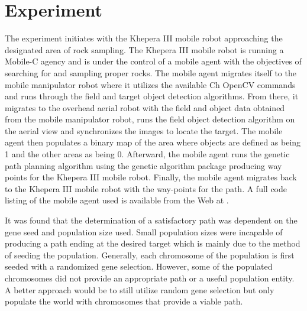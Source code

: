   \section{Experiment}
    The experiment initiates with the Khepera III mobile robot approaching the 
      designated area of rock sampling.
    The Khepera III mobile robot is running a Mobile-C agency and is under the 
      control of a mobile agent with the objectives of searching for and 
      sampling proper rocks.
    The mobile agent migrates itself to the mobile manipulator robot where it 
      utilizes the available Ch OpenCV commands and runs through the field and 
      target object detection algorithms.
    From there, it migrates to the overhead aerial robot with the field and 
      object data obtained from the mobile manipulator robot, runs the field 
      object detection algorithm on the aerial view and synchronizes the images 
      to locate the target.
    The mobile agent then populates a binary map of the area where objects are 
      defined as being 1 and the other areas as being 0.
    Afterward, the mobile agent runs the genetic path planning algorithm using 
      the genetic algorithm package producing way points for the Khepera III mobile robot.
    Finally, the mobile agent migrates back to the Khepera III mobile robot with
      the way-points for the path.
    A full code listing of the mobile agent used is available from the Web at 
      \cite{mobilec_vision_webpage}.

    It was found that the determination of a satisfactory path was dependent on
      the gene seed and population size used.
    Small population sizes were incapable of producing a path ending at the 
      desired target which is mainly due to the method of seeding the 
      population.
    Generally, each chromosome of the population is first seeded with a 
      randomized gene selection.
    However, some of the populated chromosomes did not provide an appropriate 
      path or a useful population entity.
    A better approach would be to still utilize random gene selection but only 
      populate the world with chromosomes that provide a viable path.

